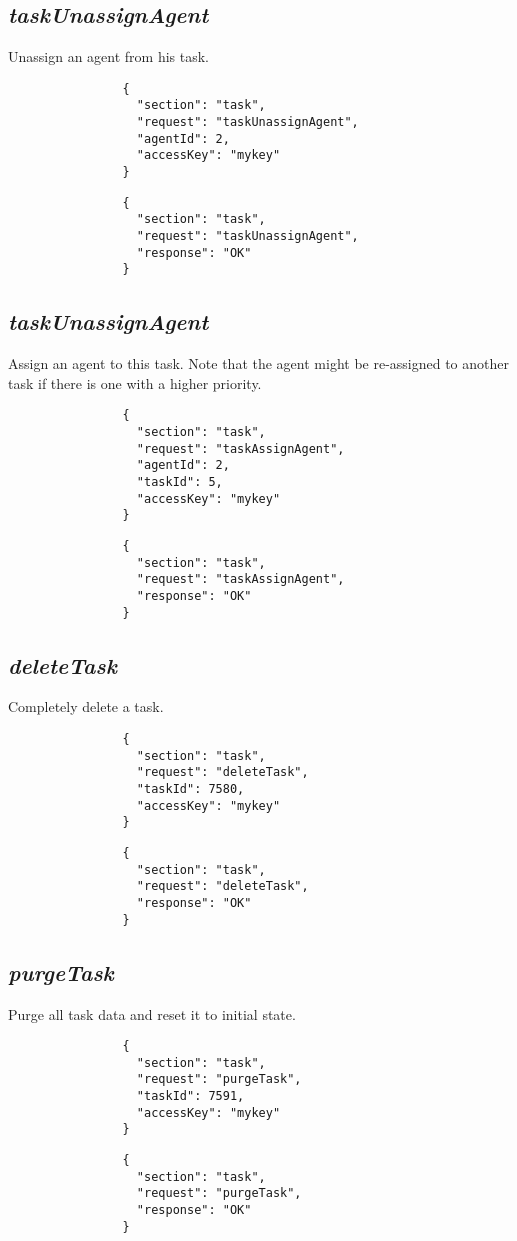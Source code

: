 		\subsection*{\textit{taskUnassignAgent}}
			Unassign an agent from his task.
			{
				\color{blue}
				\begin{verbatim}
				{
				  "section": "task",
				  "request": "taskUnassignAgent",
				  "agentId": 2,
				  "accessKey": "mykey"
				}
				\end{verbatim}
			}
			{
				\color{OliveGreen}
				\begin{verbatim}
				{
				  "section": "task",
				  "request": "taskUnassignAgent",
				  "response": "OK"
				}
				\end{verbatim}
			}
		\subsection*{\textit{taskUnassignAgent}}
			Assign an agent to this task. Note that the agent might be re-assigned to another task if there is one with a higher priority.
			{
				\color{blue}
				\begin{verbatim}
				{
				  "section": "task",
				  "request": "taskAssignAgent",
				  "agentId": 2,
				  "taskId": 5,
				  "accessKey": "mykey"
				}
				\end{verbatim}
			}
			{
				\color{OliveGreen}
				\begin{verbatim}
				{
				  "section": "task",
				  "request": "taskAssignAgent",
				  "response": "OK"
				}
				\end{verbatim}
			}
		\subsection*{\textit{deleteTask}}
			Completely delete a task.
			{
				\color{blue}
				\begin{verbatim}
				{
				  "section": "task",
				  "request": "deleteTask",
				  "taskId": 7580,
				  "accessKey": "mykey"
				}
				\end{verbatim}
			}
			{
				\color{OliveGreen}
				\begin{verbatim}
				{
				  "section": "task",
				  "request": "deleteTask",
				  "response": "OK"
				}
				\end{verbatim}
			}		
		\subsection*{\textit{purgeTask}}
			Purge all task data and reset it to initial state.
			{
				\color{blue}
				\begin{verbatim}
				{
				  "section": "task",
				  "request": "purgeTask",
				  "taskId": 7591,
				  "accessKey": "mykey"
				}
				\end{verbatim}
			}
			{
				\color{OliveGreen}
				\begin{verbatim}
				{
				  "section": "task",
				  "request": "purgeTask",
				  "response": "OK"
				}
				\end{verbatim}
			}
